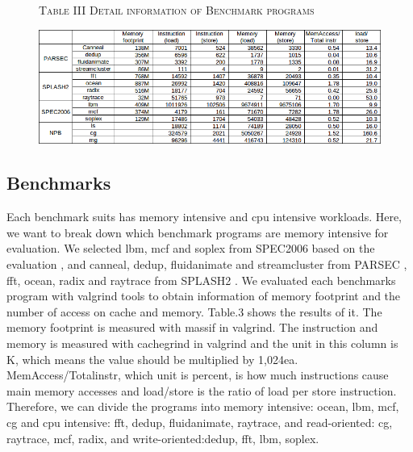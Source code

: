 \documentclass[a4paper, 11pt, conference]{ieeeconf}      %
\begin{document}
\begin{figure}
 \begin{center}
  	{\textsc{Table III Detail information of Benchmark programs}}
  \end{center}
  \vspace{2mm}
\includegraphics[width=\textwidth]{Architecture/4-BenchPrograms.png}
\end{figure}

\subsection{Benchmarks}
	Each benchmark suits has memory intensive and cpu intensive workloads. Here, we want to break down which benchmark programs are memory intensive for evaluation.  We selected lbm, mcf and soplex from SPEC2006 based on the evaluation \cite{jaleel2010memory}, and canneal, dedup, fluidanimate and streamcluster from PARSEC \cite{bienia2008parsec}, fft, ocean, radix and raytrace from SPLASH2 \cite{woo1995splash}.
We evaluated each benchmarks program with valgrind tools to obtain information of memory footprint and the number of access on cache and memory.  Table.3 shows the results of it. The memory footprint is measured with massif in valgrind. The instruction and memory is measured with cachegrind in valgrind and the unit in this column is K, which means the value should be multiplied by 1,024ea.  MemAccess/Totalinstr, which unit is percent, is how much instructions cause main memory accesses and load/store is the ratio of load per store instruction. Therefore, we can divide the programs into memory intensive: ocean, lbm, mcf, cg and cpu intensive: fft, dedup, fluidanimate, raytrace, and read-oriented: cg, raytrace, mcf, radix, and write-oriented:dedup, fft, lbm, soplex.
\end{document}
